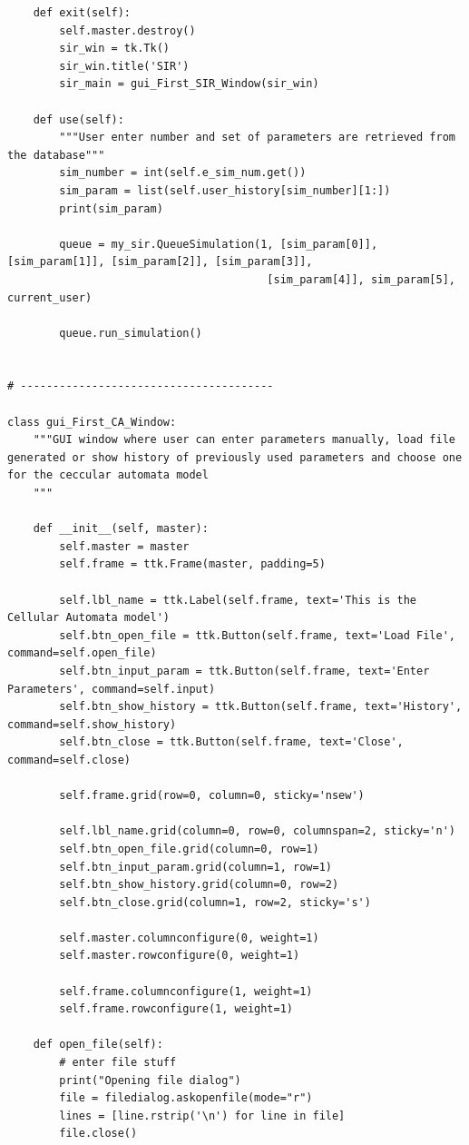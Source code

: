 \documentclass[11pt, a4paper]{article}
\begin{document}
\begin{lstlisting}
    def exit(self):
        self.master.destroy()
        sir_win = tk.Tk()
        sir_win.title('SIR')
        sir_main = gui_First_SIR_Window(sir_win)

    def use(self):
        """User enter number and set of parameters are retrieved from the database"""
        sim_number = int(self.e_sim_num.get())
        sim_param = list(self.user_history[sim_number][1:])
        print(sim_param)

        queue = my_sir.QueueSimulation(1, [sim_param[0]], [sim_param[1]], [sim_param[2]], [sim_param[3]],
                                        [sim_param[4]], sim_param[5], current_user)

        queue.run_simulation()


# ---------------------------------------

class gui_First_CA_Window:
    """GUI window where user can enter parameters manually, load file generated or show history of previously used parameters and choose one for the ceccular automata model
    """

    def __init__(self, master):
        self.master = master
        self.frame = ttk.Frame(master, padding=5)

        self.lbl_name = ttk.Label(self.frame, text='This is the Cellular Automata model')
        self.btn_open_file = ttk.Button(self.frame, text='Load File', command=self.open_file)
        self.btn_input_param = ttk.Button(self.frame, text='Enter Parameters', command=self.input)
        self.btn_show_history = ttk.Button(self.frame, text='History', command=self.show_history)
        self.btn_close = ttk.Button(self.frame, text='Close', command=self.close)

        self.frame.grid(row=0, column=0, sticky='nsew')

        self.lbl_name.grid(column=0, row=0, columnspan=2, sticky='n')
        self.btn_open_file.grid(column=0, row=1)
        self.btn_input_param.grid(column=1, row=1)
        self.btn_show_history.grid(column=0, row=2)
        self.btn_close.grid(column=1, row=2, sticky='s')

        self.master.columnconfigure(0, weight=1)
        self.master.rowconfigure(0, weight=1)

        self.frame.columnconfigure(1, weight=1)
        self.frame.rowconfigure(1, weight=1)

    def open_file(self):
        # enter file stuff
        print("Opening file dialog")
        file = filedialog.askopenfile(mode="r")
        lines = [line.rstrip('\n') for line in file]
        file.close()


\end{lstlisting}
\end{document}
